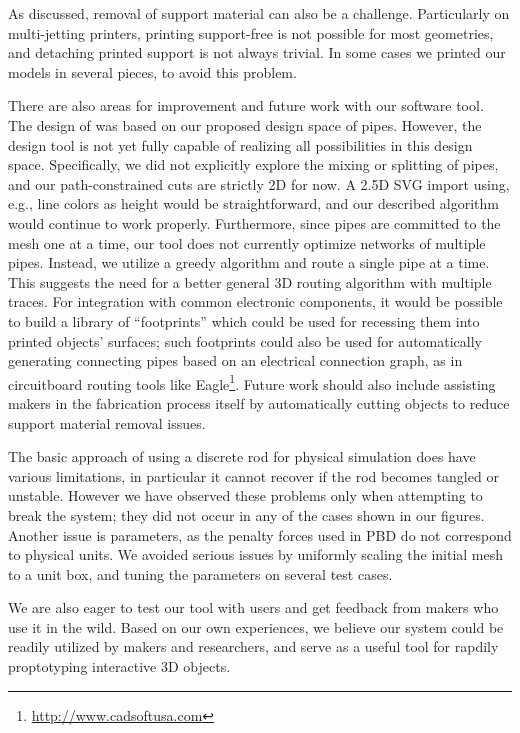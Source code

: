 As discussed, removal of support material can also be a challenge.  Particularly on multi-jetting printers, printing support-free is not possible for most geometries, and detaching printed support is not always trivial. In some cases we printed our models in several pieces, to avoid this problem. 

There are also areas for improvement and future work with our software tool.  The design of \systemname was based on our proposed design space of pipes.  However, the design tool is not yet fully capable of realizing all possibilities in this design space.  Specifically, we did not explicitly explore the mixing or splitting of pipes, and our path-constrained cuts are strictly 2D for now.  A 2.5D SVG import using, e.g., line colors as height would be straightforward, and our described algorithm would continue to work properly.  Furthermore, since pipes are committed to the mesh one at a time, our tool does not currently optimize networks of multiple pipes. Instead, we utilize a greedy algorithm and route a single pipe at a time.  This suggests the need for a better general 3D routing algorithm with multiple traces.  For integration with common electronic components, it would be possible to build a library of ``footprints'' which could be used for recessing them into printed objects' surfaces; such footprints could also be used for automatically generating connecting pipes based on an electrical connection graph, as in circuitboard routing tools like Eagle\footnote{\url{http://www.cadsoftusa.com}}.  Future work should also include assisting makers in the fabrication process itself by automatically cutting objects to reduce support material removal issues. %

The basic approach of using a discrete rod for physical simulation does have various limitations, in particular it
cannot recover if the rod becomes tangled or unstable. 
However we have observed these problems only when attempting to break
the system; they did not occur in any of the cases shown in our figures.
Another issue is parameters, as the penalty forces used in PBD do not
correspond to physical units. We avoided serious issues by uniformly
scaling the initial mesh to a unit box, and tuning the parameters on several test cases.

We are also eager to test our tool with users and get feedback from makers who use it in the wild. Based on our own experiences, we believe our system could be readily utilized by makers and researchers, and serve as a useful tool for rapdily proptotyping interactive 3D objects.
